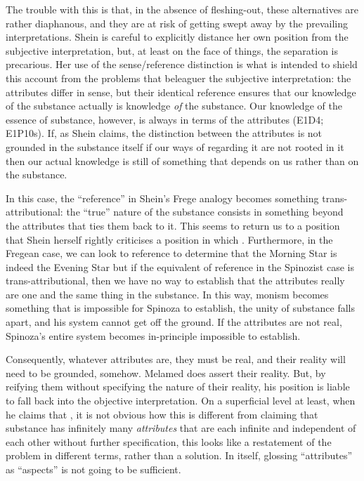 \documentclass[11pt]{article}
\newcommand{\dash}{\unskip{---}}
\begin{document}
	The trouble with this is that, in the absence of fleshing-out, these alternatives are rather diaphanous, and they are at risk of getting swept away by the prevailing interpretations. Shein is careful to explicitly distance her own position from the subjective interpretation, but, at least on the face of things, the separation is precarious. Her use of the sense/reference distinction is what is intended to shield this account from the problems that beleaguer the subjective interpretation: the attributes differ in sense, but their identical reference ensures that our knowledge of the substance actually is knowledge \emph{of} the substance. Our knowledge of the essence of substance, however, is always in terms of the attributes (E1D4; E1P10s). If, as Shein claims, the distinction between the attributes is not grounded in the substance itself \dash if our ways of regarding it are not rooted in it \dash then our actual knowledge is still of something that depends on us rather than on the substance.
	
	In this case, the \enquote{reference} in Shein's Frege analogy becomes something trans-attributional: the \enquote{true} nature of the substance consists in something beyond the attributes that ties them back to it. This seems to return us to a position that Shein herself rightly criticises \dash a position in which . Furthermore, in the Fregean case, we can look to reference to determine that the Morning Star is indeed the Evening Star \dash but if the equivalent of reference in the Spinozist case is trans-attributional, then we have no way to establish that the attributes really are one and the same thing in the substance. In this way, monism becomes something that is impossible for Spinoza to establish, the unity of substance falls apart, and his system cannot get off the ground. If the attributes are not real, Spinoza’s entire system becomes in-principle impossible to establish.
	
	Consequently, whatever attributes are, they must be real, and their reality will need to be grounded, somehow. Melamed does assert their reality. But, by reifying them without specifying the nature of their reality, his position is liable to fall back into the objective interpretation. On a superficial level at least, when he claims that , it is not obvious how this is different from claiming that substance has infinitely many \emph{attributes} that are each infinite and independent of each other \dash without further specification, this looks like a restatement of the problem in different terms, rather than a solution. In itself, glossing \enquote{attributes} as \enquote{aspects} is not going to be sufficient.
		
\end{document}

